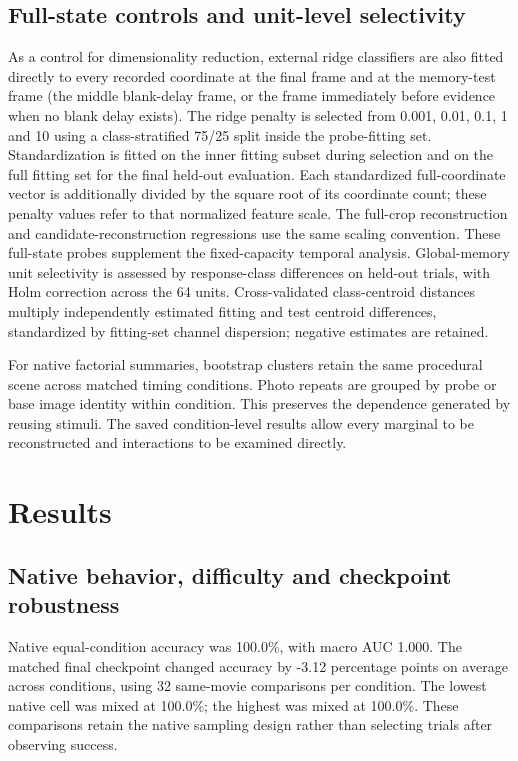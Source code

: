 \documentclass[11pt]{article}
\begin{document}
\subsection{Full-state controls and unit-level selectivity}
As a control for dimensionality reduction, external ridge classifiers are also fitted directly to every recorded coordinate at the final frame and at the memory-test frame (the middle blank-delay frame, or the frame immediately before evidence when no blank delay exists). The ridge penalty is selected from 0.001, 0.01, 0.1, 1 and 10 using a class-stratified 75/25 split inside the probe-fitting set. Standardization is fitted on the inner fitting subset during selection and on the full fitting set for the final held-out evaluation. Each standardized full-coordinate vector is additionally divided by the square root of its coordinate count; these penalty values refer to that normalized feature scale. The full-crop reconstruction and candidate-reconstruction regressions use the same scaling convention. These full-state probes supplement the fixed-capacity temporal analysis. Global-memory unit selectivity is assessed by response-class differences on held-out trials, with Holm correction across the 64 units. Cross-validated class-centroid distances multiply independently estimated fitting and test centroid differences, standardized by fitting-set channel dispersion; negative estimates are retained.

For native factorial summaries, bootstrap clusters retain the same procedural scene across matched timing conditions. Photo repeats are grouped by probe or base image identity within condition. This preserves the dependence generated by reusing stimuli. The saved condition-level results allow every marginal to be reconstructed and interactions to be examined directly.
\section{Results}
\subsection{Native behavior, difficulty and checkpoint robustness}
Native equal-condition accuracy was 100.0\%, with macro AUC 1.000. The matched final checkpoint changed accuracy by -3.12 percentage points on average across conditions, using 32 same-movie comparisons per condition. The lowest native cell was mixed at 100.0\%; the highest was mixed at 100.0\%. These comparisons retain the native sampling design rather than selecting trials after observing success.
\end{document}
